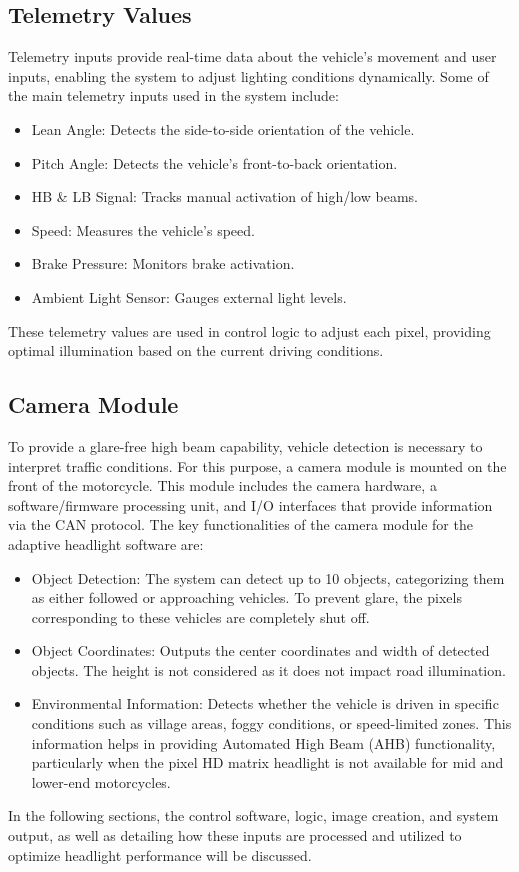 \subsection{Telemetry Values}
Telemetry inputs provide real-time data about the vehicle's movement and user inputs, enabling the system to adjust lighting conditions dynamically. Some of the main telemetry inputs used in the system include:

\begin{itemize}
    \item Lean Angle: Detects the side-to-side orientation of the vehicle.
    \item Pitch Angle: Detects the vehicle's front-to-back orientation.
    \item HB \& LB Signal: Tracks manual activation of high/low beams.
    \item Speed: Measures the vehicle's speed.
    \item Brake Pressure: Monitors brake activation.
    \item Ambient Light Sensor: Gauges external light levels.
\end{itemize}


These telemetry values are used in control logic to adjust each pixel, providing optimal illumination based on the current driving conditions.

\subsection{Camera Module}
To provide a glare-free high beam capability, vehicle detection is necessary to interpret traffic conditions. For this purpose, a camera module is mounted on the front of the motorcycle. This module includes the camera hardware, a software/firmware processing unit, and I/O interfaces that provide information via the CAN protocol. The key functionalities of the camera module for the adaptive headlight software are:

\begin{itemize}
    \item Object Detection: The system can detect up to 10 objects, categorizing them as either followed or approaching vehicles. To prevent glare, the pixels corresponding to these vehicles are completely shut off.
    \item Object Coordinates: Outputs the center coordinates and width of detected objects. The height is not considered as it does not impact road illumination.
    \item Environmental Information: Detects whether the vehicle is driven in specific conditions such as village areas, foggy conditions, or speed-limited zones. This information helps in providing Automated High Beam (AHB) functionality, particularly when the pixel HD matrix headlight is not available for mid and lower-end motorcycles.
\end{itemize}
In the following sections, the control software, logic, image creation, and system output, as well as detailing how these inputs are processed and utilized to optimize headlight performance will be discussed.


